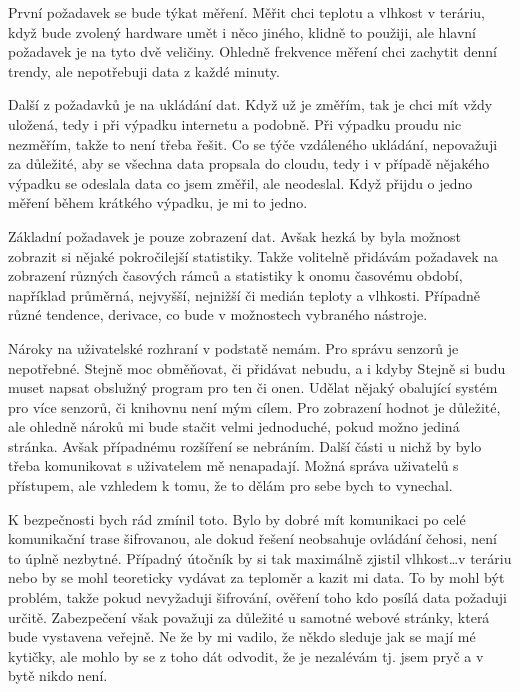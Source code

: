 
První požadavek se bude týkat měření. Měřit chci teplotu a vlhkost v teráriu, když bude zvolený hardware umět i něco 
jiného, klidně to použiji, ale hlavní požadavek je na tyto dvě veličiny. Ohledně frekvence měření chci zachytit denní 
trendy, ale nepotřebuji data z každé minuty.

Další z požadavků je na ukládání dat. Když už je změřím, tak je chci mít vždy uložená, tedy i při výpadku internetu 
a podobně. Při výpadku proudu nic nezměřím, takže to není třeba řešit. Co se týče vzdáleného ukládání, nepovažuji za 
důležité, aby se všechna data propsala do cloudu, tedy i v případě nějakého výpadku se odeslala data co jsem změřil, ale 
neodeslal. Když přijdu o jedno měření během krátkého výpadku, je mi to jedno.%

Základní požadavek je pouze zobrazení dat. Avšak hezká by byla možnost zobrazit si nějaké pokročilejší statistiky. Takže 
volitelně přidávám požadavek na zobrazení různých časových rámců a statistiky k onomu časovému období, například 
průměrná, nejvyšší, nejnižší či medián teploty a vlhkosti. Případně různé tendence, derivace, co bude v možnostech 
vybraného nástroje.

Nároky na uživatelské rozhraní v podstatě nemám. Pro správu senzorů je nepotřebné. Stejně moc obměňovat, či přidávat 
nebudu, a i kdyby Stejně si budu muset napsat obslužný program pro ten či onen. Udělat nějaký obalující systém pro více 
senzorů, či knihovnu není mým cílem. Pro zobrazení hodnot je důležité, ale ohledně nároků mi bude stačit velmi 
jednoduché, pokud možno jediná stránka. Avšak případnému rozšíření se nebráním. Další části u nichž by bylo třeba 
komunikovat s uživatelem mě nenapadají. Možná správa uživatelů s přístupem, ale vzhledem k tomu, že to dělám pro sebe 
bych to vynechal.

K bezpečnosti bych rád zmínil toto. Bylo by dobré mít komunikaci po celé komunikační trase šifrovanou, ale dokud řešení 
neobsahuje ovládání čehosi, není to úplně nezbytné. Případný útočník by si tak maximálně zjistil vlhkost\ldots v teráriu
nebo by se mohl teoreticky vydávat za teploměr a kazit mi data. To by mohl být problém, takže pokud nevyžaduji 
šifrování, ověření toho kdo posílá data požaduji určitě. Zabezpečení však považuji za důležité u samotné webové stránky, 
která bude vystavena veřejně. Ne že by mi vadilo, že někdo sleduje jak se mají mé kytičky, ale mohlo by se z toho dát 
odvodit, že je nezalévám tj. jsem pryč a v bytě nikdo není.%

